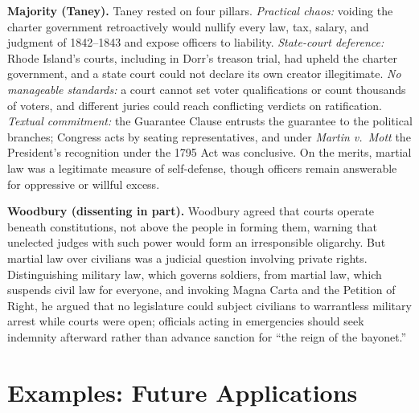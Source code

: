 \documentclass[12pt]{article}
\begin{document}
\textbf{Majority (Taney).} Taney rested on four pillars. \emph{Practical chaos:} voiding the charter government retroactively would nullify every law, tax, salary, and judgment of 1842--1843 and expose officers to liability. \emph{State-court deference:} Rhode Island's courts, including in Dorr's treason trial, had upheld the charter government, and a state court could not declare its own creator illegitimate. \emph{No manageable standards:} a court cannot set voter qualifications or count thousands of voters, and different juries could reach conflicting verdicts on ratification. \emph{Textual commitment:} the Guarantee Clause entrusts the guarantee to the political branches; Congress acts by seating representatives, and under \textit{Martin v.\ Mott} the President's recognition under the 1795 Act was conclusive. On the merits, martial law was a legitimate measure of self-defense, though officers remain answerable for oppressive or willful excess.

\textbf{Woodbury (dissenting in part).} Woodbury agreed that courts operate beneath constitutions, not above the people in forming them, warning that unelected judges with such power would form an irresponsible oligarchy. But martial law over civilians was a judicial question involving private rights. Distinguishing military law, which governs soldiers, from martial law, which suspends civil law for everyone, and invoking Magna Carta and the Petition of Right, he argued that no legislature could subject civilians to warrantless military arrest while courts were open; officials acting in emergencies should seek indemnity afterward rather than advance sanction for ``the reign of the bayonet.''

\section{Examples: Future Applications}
\end{document}
